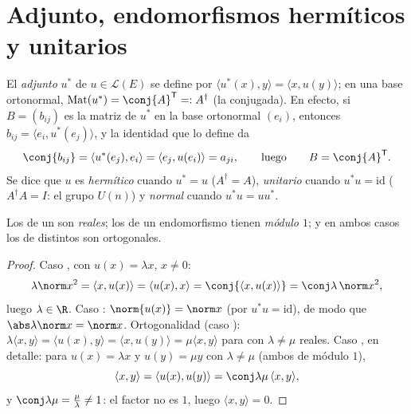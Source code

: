 \section{Adjunto, endomorfismos hermíticos y unitarios}

\begin{definition}\label{def:b2:hermitian:adjoint}
El \emph{adjunto} $u^*$ de $u \in \mathcal{L}(E)$ se define por
$\langle u^*(x), y\rangle = \langle x, u(y)\rangle$; en una base
ortonormal, $\operatorname{Mat}(u^*) = \conj{A}^{\mathsf T} =:
A^{\dagger}$ (la  conjugada). En efecto, si $B = (b_{ij})$
es la matriz de $u^*$ en la base ortonormal $(e_i)$, entonces
$b_{ij} = \langle e_i, u^*(e_j)\rangle$, y la identidad que lo define
da
\[
\conj{b_{ij}}
= \langle u^*(e_j), e_i\rangle
= \langle e_j, u(e_i)\rangle = a_{ji} ,
\qquad\text{luego}\qquad
B = \conj{A}^{\mathsf T} .
\] Se dice que $u$ es
\emph{hermítico} cuando $u^* = u$
($A^\dagger = A$), \emph{unitario} cuando $u^*u
= \mathrm{id}$ ($A^\dagger A = I$: el grupo $U(n)$) y \emph{normal}
cuando $u^*u = uu^*$.
\end{definition}

\begin{proposition}\label{prop:b2:hermitian:eigenvalues}
Los  de un  son \emph{reales};
los  de un endomorfismo  tienen
\emph{módulo $1$}; y en ambos casos los  de
 distintos son ortogonales.
\end{proposition}

\begin{proof}
Caso , con $u(x) = \lambda x$, $x \neq 0$:
\[
\lambda \norm x^2 = \langle x, u(x)\rangle = \langle u(x), x\rangle
= \conj{\langle x, u(x)\rangle} = \conj\lambda\,\norm x^2 ,
\]
luego $\lambda \in \R$. Caso : $\norm{u(x)} = \norm x$ (por
$u^*u = \mathrm{id}$), de modo que $\abs\lambda\norm x = \norm x$.
Ortogonalidad (caso ): $\lambda\langle x, y\rangle = \langle
u(x), y\rangle = \langle x, u(y)\rangle = \mu\langle x, y\rangle$
para  con $\lambda \neq \mu$ reales. Caso
, en detalle: para $u(x) = \lambda x$ y $u(y) = \mu y$ con
$\lambda \neq \mu$ (ambos de módulo $1$),
\[
\langle x, y\rangle = \langle u(x), u(y)\rangle
= \conj\lambda\mu\,\langle x, y\rangle ,
\]
y $\conj\lambda\mu = \frac{\mu}{\lambda} \neq 1$: el factor no es
$1$, luego $\langle x, y\rangle = 0$.
\end{proof}

